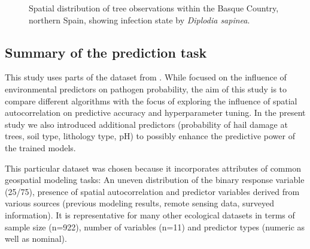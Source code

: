 \documentclass[review]{elsarticle}
\begin{document}
\begin{figure} [t!]
	\begin{center}
		\caption[Study area]{Spatial distribution of tree observations within the Basque Country, northern Spain, showing infection state by \textit{Diplodia sapinea}.}
		\label{fig: study_area}
	\end{center}
\end{figure}

\subsection{Summary of the prediction task}
This study uses parts of the dataset from \cite{Iturritxa2014}.
While \cite{Iturritxa2014} focused on the influence of environmental predictors on pathogen probability, the aim of this study is to compare different algorithms with the focus of exploring the influence of spatial autocorrelation on predictive accuracy and hyperparameter tuning.
In the present study we also introduced additional predictors (probability of hail damage at trees, soil type, lithology type, pH) to possibly enhance the predictive power of the trained models.

This particular dataset was chosen because it incorporates attributes of common geospatial modeling tasks:
An uneven distribution of the binary response variable (25/75), presence of spatial autocorrelation and predictor variables derived from various sources (previous modeling results, remote sensing data, surveyed information).
It is representative for many other ecological datasets in terms of sample size (n=922), number of variables (n=11) and predictor types (numeric as well as nominal).
\end{document}
